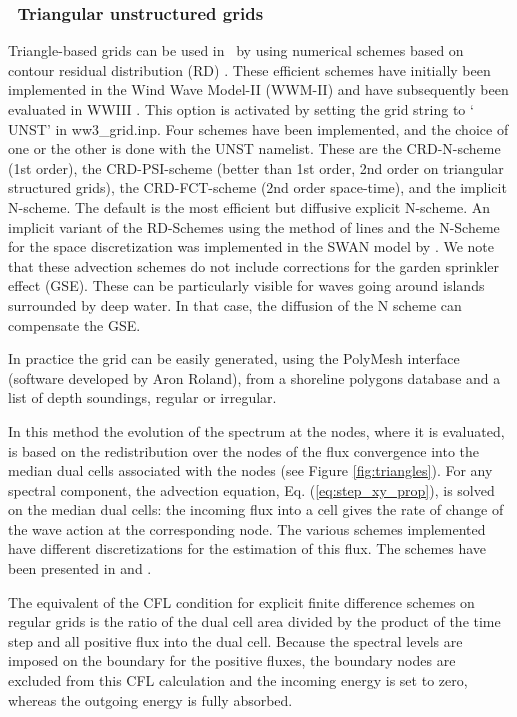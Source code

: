 \vssub
\subsubsection{~Triangular unstructured grids} \label{sub:num_space_tri}

\noindent 
Triangle-based grids can be used in \ws\ by using numerical schemes based on
contour residual distribution (RD) \citep[see][for a review]{rep:Roland2008}.
These efficient schemes have initially been implemented in the Wind Wave Model-II (WWM-II) and 
have subsequently been evaluated in WWIII \citep[e.g.][]{art:Aea09,
art:Mea10}.  This option is activated by setting the grid string to `{\code
UNST}' in {\file ww3\_grid.inp}.  Four schemes have been implemented, and the
choice of one or the other is done with the {\code UNST} namelist.  These are
the CRD-N-scheme (1st order), the CRD-PSI-scheme (better than 1st order, 2nd
order on triangular structured grids), the CRD-FCT-scheme (2nd order
space-time), and the implicit N-scheme. The default is the most efficient but
diffusive explicit N-scheme. An implicit variant of the RD-Schemes
using the method of lines and the N-Scheme for the space discretization was
implemented in the SWAN model by \cite{art:Zij10}. We note that these advection 
schemes do not include corrections for the garden sprinkler effect (GSE). These 
can be particularly visible for waves going around islands surrounded by deep 
water. In that case, the diffusion of the N scheme can compensate the GSE.

In practice the grid can be easily generated, using the PolyMesh interface
(software developed by Aron Roland), from a shoreline polygons database
\citep[e.g.][]{art:WS96} and a list of depth soundings, regular or irregular.

In this method the evolution of the spectrum at the nodes, where it is
evaluated, is based on the redistribution over the nodes of the flux
convergence into the median dual cells associated with the nodes (see Figure
\ref{fig:triangles}).  For any spectral component, the advection equation, Eq.
(\ref{eq:step_xy_prop}), is solved on the median dual cells: the incoming flux
into a cell gives the rate of change of the wave action at the corresponding
node. The various schemes implemented have different discretizations for the
estimation of this flux. The schemes have been presented in \citep[see][for a
review]{rep:Roland2008} and \citet{pro:Rol12}.

The equivalent of the CFL condition for explicit finite difference schemes 
on regular grids is the ratio of the
dual cell area divided by the product of the time step and all positive flux
into the dual cell. Because the spectral levels are imposed on the boundary
for the positive fluxes, the boundary nodes are excluded from this CFL
calculation and the incoming energy is set to zero, whereas the outgoing energy 
is fully absorbed. 

